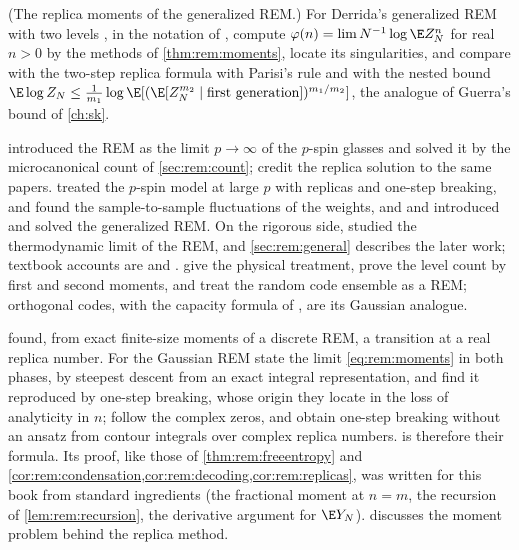 \begin{refsection}
\begin{exercises}
\item \research\harder (The replica moments of the generalized REM.) For Derrida's generalized REM with two levels \parencite{Derrida1985}, in the notation of \textcite[\S1.2]{Kistler2015}, compute $\varphi(n)=\lim N^{-1}\log\E Z_N^n$ for real $n>0$ by the methods of \cref{thm:rem:moments}, locate its singularities, and compare with the two-step replica formula with Parisi's rule and with the nested bound $\E\log Z_N\le\frac1{m_1}\log\E[(\E[Z_N^{m_2}\mid\text{first generation}])^{m_1/m_2}]$, the analogue of Guerra's bound of \cref{ch:sk}. \label{ex:rem:grem}
\end{exercises}

\notesandrefs
\Textcite{Derrida1980,Derrida1981} introduced the REM as the limit $p\to\infty$ of the $p$-spin glasses and solved it by the microcanonical count of \cref{sec:rem:count}; \textcite[notes to ch.~8]{MezardMontanari2009} credit the replica solution to the same papers. \Textcite{GrossMezard1984} treated the $p$-spin model at large $p$ with replicas and one-step breaking, \textcite{MezardParisiVirasoro1985} and \textcite{DerridaToulouse1985} found the sample-to-sample fluctuations of the weights, and \textcite{Derrida1985} and \textcite{DerridaGardner1986} introduced and solved the generalized REM. On the rigorous side, \textcite{OlivieriPicco1984} studied the thermodynamic limit of the REM, and \cref{sec:rem:general} describes the later work; textbook accounts are \textcite[chs.~9--10]{Bovier2006} and \textcite{Kistler2015}. \Textcite[chs.~5, 6, 8]{MezardMontanari2009} give the physical treatment, prove the level count by first and second moments, and treat the random code ensemble as a REM; orthogonal codes, with the capacity formula of \textcite{Shannon1949}, are its Gaussian analogue.

\Textcite{OgureKabashima2004} found, from exact finite-size moments of a discrete REM, a transition at a real replica number. For the Gaussian REM \textcite[App.~A, eqs.~(A.5)--(A.6)]{OgureKabashima2009a} state the limit \eqref{eq:rem:moments} in both phases, by steepest descent from an exact integral representation, and find it reproduced by one-step breaking, whose origin they locate in the loss of analyticity in $n$; \textcite{OgureKabashima2009b} follow the complex zeros, and \textcite{DerridaMottishaw2015} obtain one-step breaking without an ansatz from contour integrals over complex replica numbers.  is therefore their formula. Its proof, like those of \cref{thm:rem:freeentropy} and \cref{cor:rem:condensation,cor:rem:decoding,cor:rem:replicas}, was written for this book from standard ingredients (the fractional moment at $n=m$, the recursion of \cref{lem:rem:recursion}, the derivative argument for $\E Y_N$). \Textcite{Tanaka2007} discusses the moment problem behind the replica method.


\end{refsection}
